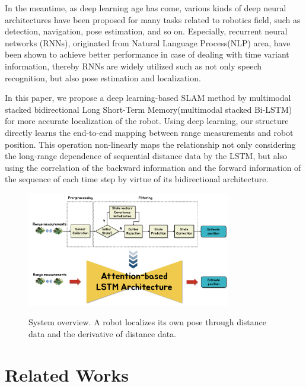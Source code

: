 \documentclass[letterpaper, 10 pt, conference]{ieeeconf}  %
\begin{document}
 In the meantime, as deep learning age has come\cite{lecun2015deep}, various kinds of deep neural architectures have been proposed for many tasks related to robotics field, such as detection\cite{lenz2015deep,cai2016unified, smith2018object}, navigation\cite{zhu2017target, hamandi2018deepmotion}, pose estimation\cite{walch2017image}, and so on. Especially, recurrent neural networks (RNNs), originated from Natural Language Process(NLP) area\cite{elman1990finding}, have been shown to achieve better performance in case of dealing with time variant information, thereby RNNs are widely utilized such as not only speech recognition, but also pose estimation and localization\cite{walch2017image, gladh2016deep, wang2017deepvo, kendall2015posenet, turan2018deep}. 
 
 In this paper, we propose a deep learning-based SLAM method by multimodal stacked bidirectional Long Short-Term Memory(multimodal stacked Bi-LSTM) for more accurate localization of the robot. Using deep learning, our structure directly learns the end-to-end mapping between range measurements and robot position. This operation non-linearly maps the relationship not only considering the long-range dependence of sequential distance data by the LSTM, but also using the correlation of the backward information and the forward information of the sequence of each time step by virtue of its bidirectional architecture.
 
\begin{figure}[h]
	
	\centering
	\includegraphics[height=5cm]{CE554_traditional_to_RNN}
	\label{fig:example}
	\caption{System overview. A robot localizes its own pose through distance data and the derivative of distance data. }
	
\end{figure}

\section{Related Works}
\end{document}
